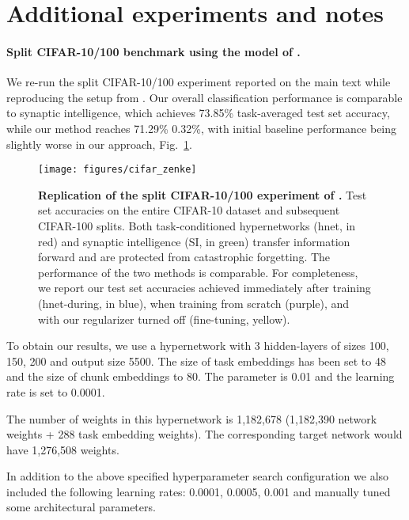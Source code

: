 \documentclass{article}
\begin{document}
\section{Additional experiments and notes}
\label{apx:extra-experiments}

\paragraph{Split CIFAR-10/100 benchmark using the model of \citet{zenke_continual_2017}.} We re-run the split CIFAR-10/100 experiment reported on the main text while reproducing the setup from \citet{zenke_continual_2017}. Our overall classification performance is comparable to synaptic intelligence, which achieves 73.85\% task-averaged test set accuracy, while our method reaches 71.29\%  0.32\%, with initial baseline performance being slightly worse in our approach, Fig.~\ref{fig:cifar-zenke}.

\begin{figure}[htbp]
    \centering
    \texttt{[image: figures/cifar\_zenke]}
    \caption{\textbf{Replication of the split CIFAR-10/100 experiment of \citet{zenke_continual_2017}.} Test set accuracies on the entire CIFAR-10 dataset and subsequent CIFAR-100 splits. Both task-conditioned hypernetworks (hnet, in red) and synaptic intelligence (SI, in green) transfer information forward and are protected from catastrophic forgetting. The performance of the two methods is comparable. For completeness, we report our test set accuracies achieved immediately after training (hnet-during, in blue), when training from scratch (purple), and with our regularizer turned off (fine-tuning, yellow). \label{fig:cifar-zenke}}
\end{figure}

To obtain our results, we use a hypernetwork with 3 hidden-layers of sizes 100, 150, 200 and output size 5500. The size of task embeddings  has been set to 48 and the size of chunk embeddings  to 80. The parameter  is 0.01 and the learning rate is set to 0.0001.

The number of weights in this hypernetwork is 1,182,678 (1,182,390 network weights + 288 task embedding weights). The corresponding target network would have 1,276,508 weights.

In addition to the above specified hyperparameter search configuration we also included the following learning rates: 0.0001, 0.0005, 0.001 and manually tuned some architectural parameters.

\clearpage
\newpage
\clearpage
\end{document}
